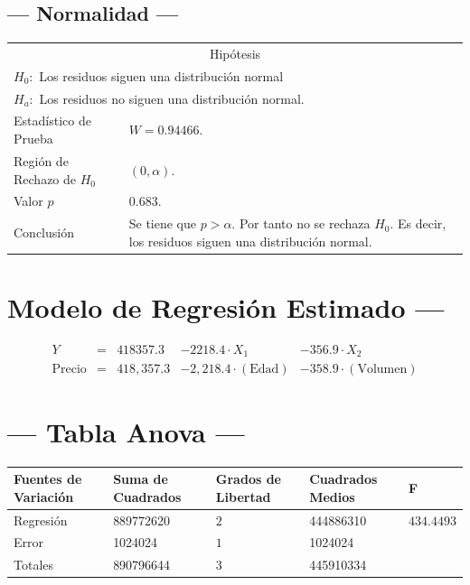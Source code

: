\documentclass{article}
\begin{document}
\subsection{--- Normalidad ---} %
\begin{center}
  \begin{tabular}{|l|p{8cm}|}
    \cline{1-2}
    \multicolumn{2}{|c|}{Hipótesis}\\ \cline{1-2}
    \multicolumn{2}{|l|}{\(H_0:\) Los residuos siguen una distribución normal} \\ 
    \multicolumn{2}{|l|}{\(H_a:\) Los residuos no siguen una distribución normal.} \\ \cline{1-2}
    Estadístico de Prueba & \(W = 0.94466\).\\ \cline{1-2} 
		Región de Rechazo de \(H_0\) & \((0, \alpha )\).\\ \cline{1-2} 
    Valor \(p\) & \(0.683\).\\ \cline{1-2} 
    Conclusión & Se tiene que \(p> \alpha\). \newline 
		Por tanto no se rechaza \(H_0\). \newline 
		Es decir, los residuos siguen una distribución normal.\\ \cline{1-2} 
  \end{tabular}
\end{center}


\newpage

\section{\centering Modelo de Regresión Estimado ---} %
\begin{align}
	Y & = &  418357.3  & -2218.4 \cdot X_1     & -356.9 \cdot X_2   \\[2mm]
	\mbox{Precio} & = &  418,357.3 & - 2,218.4 \cdot (\mbox{Edad}) & - 358.9 \cdot (\mbox{Volumen})
	\label{eq:1}
\end{align}

\section{\centering --- Tabla Anova ---} %
\begin{center}
  \begin{tabular}{|l|l|l|l|l|}
    \hline 
    Fuentes de Variación  & Suma de Cuadrados & Grados de Libertad & Cuadrados Medios & F\\ \hline 
    Regresión           & 889772620 &           \(2\) & 444886310 & \(434.4493\) \\ \hline 
    Error               &   1024024 &          \(1\)  &   1024024 &   \\ \hline 
    Totales             & 890796644 &          \(3\)  & 445910334 &   \\ \hline 
  \end{tabular}
\end{center} 
\end{document}
